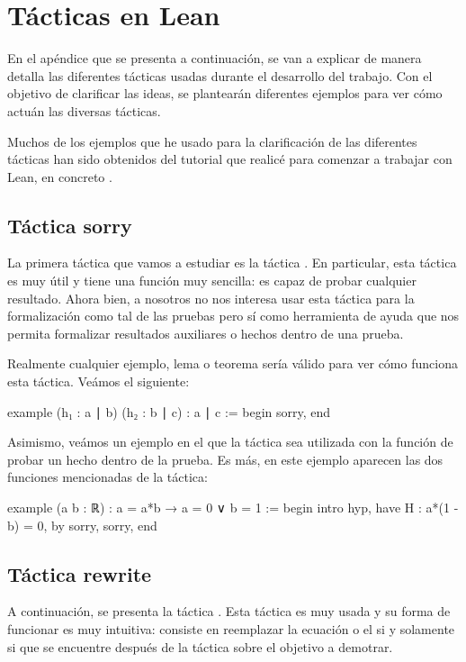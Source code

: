 \chapter{Tácticas en Lean}\label{apentacti}

En el apéndice que se presenta a continuación, se van a explicar de manera
detalla las diferentes tácticas usadas durante el desarrollo del trabajo.
Con el objetivo de clarificar las ideas, se plantearán diferentes ejemplos
para ver cómo actuán las diversas tácticas.

Muchos de los ejemplos que he usado para la clarificación de las diferentes
tácticas han sido obtenidos del tutorial que realicé para comenzar a trabajar
con Lean, en concreto \cite{tutor}.

\section{Táctica sorry}

La primera táctica que vamos a estudiar es la táctica .
En particular, esta táctica es muy útil y tiene una función muy sencilla:
es capaz de probar cualquier resultado. Ahora bien, a nosotros no nos interesa
usar esta táctica para la formalización como tal de las pruebas pero sí como
herramienta de ayuda que nos permita formalizar resultados auxiliares o
hechos dentro de una prueba.

Realmente cualquier ejemplo, lema o teorema sería válido para ver cómo funciona
esta táctica. Veámos el siguiente:
\begin{leancode}
example (h₁ : a ∣ b) (h₂ : b ∣ c) : a ∣ c :=
begin
  sorry,
end
\end{leancode}

Asimismo, veámos un ejemplo en el que la táctica  sea
utilizada con la función de probar un hecho dentro de la prueba. Es más,
en este ejemplo aparecen las dos funciones mencionadas de la táctica:
\begin{leancode}
example (a b : ℝ) : a = a*b → a = 0 ∨ b = 1 :=
begin
  intro hyp,
  have H : a*(1 - b) = 0, by sorry,
  sorry,
end
\end{leancode}

\section{Táctica rewrite}

A continuación, se presenta la táctica . Esta táctica
es muy usada y su forma de funcionar es muy intuitiva: consiste en reemplazar
la ecuación o el si y solamente si que se encuentre después de la táctica
 sobre el objetivo a demotrar.

